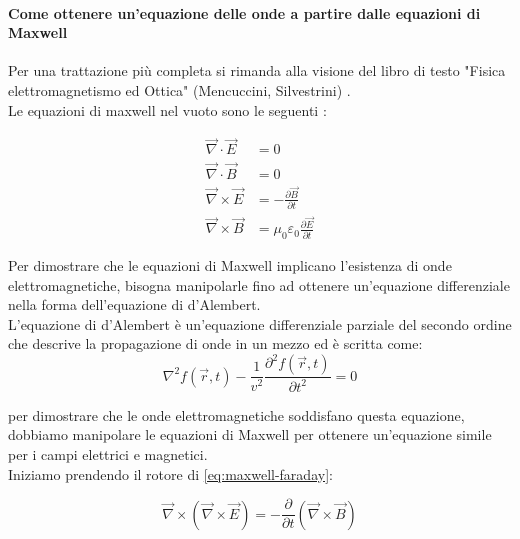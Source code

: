 \paragraph{Come ottenere un'equazione delle onde a partire dalle equazioni di Maxwell}
Per una trattazione più completa si rimanda alla visione del libro di testo "Fisica elettromagnetismo ed Ottica" (Mencuccini, Silvestrini) \cite{mencuccini2016fisII}.\\
Le equazioni di maxwell nel vuoto sono le seguenti :

\begin{subequations}\label{eq:maxwell}
\begin{align}
\vec{\nabla} \cdot \vec{E} &= 0 \label{eq:maxwell-gauss-e}\\
\vec{\nabla} \cdot \vec{B} &= 0 \label{eq:maxwell-gauss-b}\\
\vec{\nabla} \times \vec{E} &= -\frac{\partial \vec{B}}{\partial t} \label{eq:maxwell-faraday}\\
\vec{\nabla} \times \vec{B} &= \mu_0 \varepsilon_0 \frac{\partial \vec{E}}{\partial t} \label{eq:maxwell-ampere}
\end{align}
\end{subequations}

Per dimostrare che le equazioni di Maxwell implicano l'esistenza di onde elettromagnetiche, bisogna manipolarle fino ad ottenere 
un'equazione differenziale nella forma dell'equazione di d'Alembert.\\
L'equazione di d'Alembert è un'equazione differenziale parziale del secondo ordine che descrive la propagazione di onde in un mezzo ed è scritta come:
\begin{equation}
    \nabla^2 f(\vec{r},t) - \frac{1}{v^2}\frac{\partial^2 f(\vec{r},t)}{\partial t^2} = 0
\end{equation}

per dimostrare che le onde elettromagnetiche soddisfano questa equazione, dobbiamo manipolare le equazioni di Maxwell per ottenere un'equazione simile per i campi elettrici e magnetici.\\
Iniziamo prendendo il rotore di \eqref{eq:maxwell-faraday}:

\begin{equation}\label{eq:maxwellxrotor}
\vec{\nabla} \times (\vec{\nabla} \times \vec{E}) = -\frac{\partial}{\partial t} (\vec{\nabla} \times \vec{B})
\end{equation}

